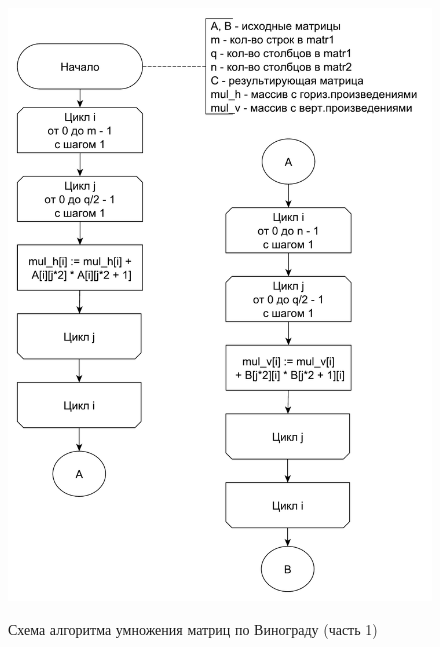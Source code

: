 \documentclass[a4paper,14pt]{article}
\begin{document}
        \begin{figure}[h!]
        	\begin{center}
        		{\includegraphics[scale = 0.5]{schema06.pdf}}
        		\caption{Схема алгоритма умножения матриц по Винограду (часть 1)}
        		\label{fig:schema_mult_v_1}
        	\end{center}
        \end{figure}
        
\end{document}
